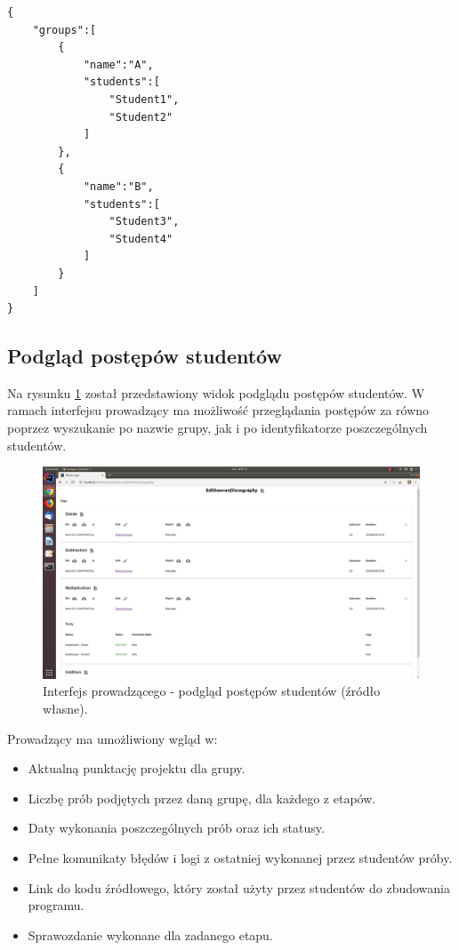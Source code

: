 {\selectfont
\footnotesize
\begin{lstlisting}
{
    "groups":[
        {
            "name":"A",
            "students":[
                "Student1",
                "Student2"
            ]
        },
        {
            "name":"B",
            "students":[
                "Student3",
                "Student4"
            ]
        }
    ]
}
\end{lstlisting}
}

\subsection{Podgląd postępów studentów}

Na rysunku \ref{fig:lecturer-interface-view} został przedstawiony widok podglądu postępów studentów.
W ramach interfejsu prowadzący ma możliwość przeglądania postępów za równo poprzez wyszukanie po nazwie grupy, jak i po identyfikatorze poszczególnych studentów.

\begin{figure}[h]
    \centering
    \includegraphics[width = 13cm]{chapter04/lecturer_interface_view.png}
    \caption{Interfejs prowadzącego - podgląd postępów studentów (źródło własne).}
    \label{fig:lecturer-interface-view}
\end{figure}

Prowadzący ma umożliwiony wgląd w:
\begin {itemize}
    \item Aktualną punktację projektu dla grupy.
    \item Liczbę prób podjętych przez daną grupę, dla każdego z etapów.
    \item Daty wykonania poszczególnych prób oraz ich statusy.
    \item Pełne komunikaty błędów i logi z ostatniej wykonanej przez studentów próby.
    \item Link do kodu źródłowego, który został użyty przez studentów do zbudowania programu.
    \item Sprawozdanie wykonane dla zadanego etapu.
\end {itemize}

